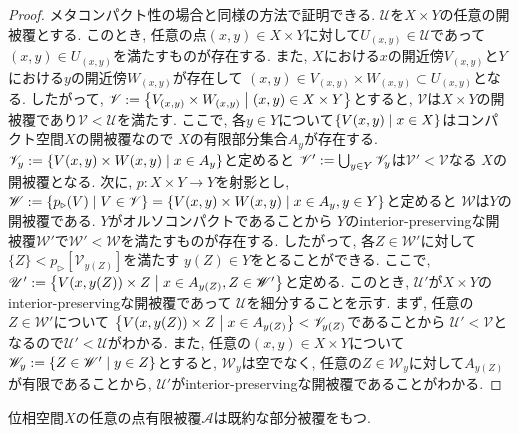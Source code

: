 \documentclass[uplatex, dvipdfmx, a4paper, 12pt, class=jsbook, crop=false]{standalone}
\newcommand{\imgto}{{}\triangleright{}}
\begin{document}
\begin{proof}
	メタコンパクト性の場合と同様の方法で証明できる. $ \mathscr{U} $を$ X \times Y $の任意の開被覆とする. 
	このとき, 任意の点$ (x, y) \in X \times Y $に対して$ U_{(x, y)} \in \mathscr{U} $であって
	$ (x, y) \in U_{(x, y)} $を満たすものが存在する. 
	また, $ X $における$ x $の開近傍$ V_{(x, y)} $と$ Y $における$ y $の開近傍$ W_{(x, y)} $が存在して
	$ (x, y) \in V_{(x,y)} \times W_{(x, y)} \subset U_{(x, y)} $となる. 
	したがって, $ \mathscr{V} \defeq \setcomp{V_{(x, y)} \times W_{(x, y)}}{(x, y) \in X \times Y} $とすると, 
	$ \mathscr{V} $は$ X \times Y $の開被覆であり$ \mathscr{V} < \mathscr{U} $を満たす. 
	ここで, 各$ y \in Y $について$ \setcomp{V(x, y)}{x \in X} $はコンパクト空間$ X $の開被覆なので
	$ X $の有限部分集合$ A_y $が存在する. 
	$ \mathscr{V}_y \defeq \setcomp{V(x, y) \times W(x, y)}{x \in A_y} $と定めると
	$ \mathscr{V}' \mathrel{:=} \bigcup_{y \in Y}\mathscr{V}_y $は$ \mathscr{V}' < \mathscr{V} $なる
	$ X $の開被覆となる. 次に, $ p \colon X \times Y \to Y $を射影とし, 
	$ \mathscr{W} \defeq \setcomp{p_{\imgto}(V)}{V \in \mathscr{V}} = \setcomp{V(x, y) \times W(x, y)}{x \in A_y, y \in Y} $と定めると
	$ \mathscr{W} $は$ Y $の開被覆である. $ Y $がオルソコンパクトであることから
	$ Y $のinterior-preservingな開被覆$ \mathscr{W}' $で$ \mathscr{W}' < \mathscr{W} $を満たすものが存在する. 
	したがって, 各$ Z \in \mathscr{W}' $に対して$ \{Z\} <  p_{\imgto}[\mathscr{V}_{y(Z)}] $を満たす
	$ y(Z) \in Y $をとることができる. 
	ここで, $ \mathscr{U}' \defeq  \setcomp{V(x, y(Z)) \times Z}{x \in A_{y(Z)}, Z \in \mathscr{W}'} $と定める. 
	このとき, $ \mathscr{U}' $が$ X \times Y $のinterior-preservingな開被覆であって
	$ \mathscr{U} $を細分することを示す. まず, 任意の$ Z \in \mathscr{W}' $について
	$ \setcomp{V(x, y(Z)) \times Z}{x \in A_{y(Z)}} < \mathscr{V}_{y(Z)} $であることから
	$ \mathscr{U}' < \mathscr{V} $となるので$ \mathscr{U}' < \mathscr{U} $がわかる. 
	また, 任意の$ (x, y) \in X \times Y $について
	$ \mathscr{W}_y \defeq \setcomp{Z \in \mathscr{W}'}{y \in Z} $とすると, $ \mathscr{W}_y $は空でなく, 
	任意の$ Z \in \mathscr{W}_y $に対して$ A_{y(Z)} $が有限であることから, 
	$ \mathscr{U}' $がinterior-preservingな開被覆であることがわかる.
\end{proof}

\begin{proposition}
	\label{prop:Every point finite cover A of X has an irreducible subcover}
	位相空間$ X $の任意の点有限被覆$ \mathscr{A} $は既約な部分被覆をもつ.
\end{proposition}
\end{document}
